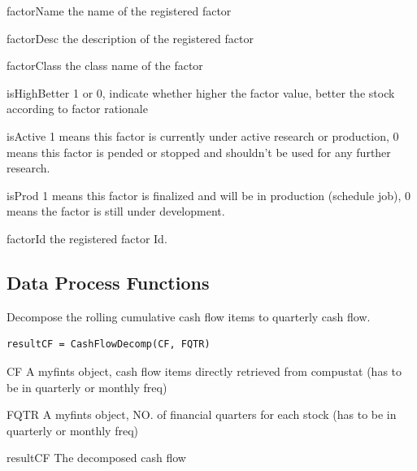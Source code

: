 \inarg
   \begin{argdesc}
   \item[factorName] the name of the registered factor
   \item[factorDesc] the description of the registered factor
   \item[factorClass] the \matlab{} class name of the factor
   \item[isHighBetter] 1 or 0, indicate whether higher the factor value, 
        better the stock according to factor rationale
   \item[isActive] 1 means this factor is currently under active research or production, 
        0 means this factor is pended or stopped and shouldn't be used for any further research. 
   \item[isProd] 1 means this factor is finalized and will be in production (schedule job), 
        0 means the factor is still under development.
   \end{argdesc}

\outarg
   \begin{argdesc}
	  \item[factorId] the registered factor Id. 
   \end{argdesc}


\subsection{Data Process Functions}

Decompose the rolling cumulative cash flow items to quarterly cash flow.

\usage
   \begin{lstlisting}[numbers=none]
   resultCF = CashFlowDecomp(CF, FQTR)
   \end{lstlisting}
   
\inarg
   \begin{argdesc}
	\item[CF] A myfints object, cash flow items directly retrieved from compustat (has to be in quarterly or monthly freq)
	\item[FQTR] A myfints object, NO. of financial quarters for each stock (has to be in quarterly or monthly freq)
   \end{argdesc}
   
\outarg
   \begin{argdesc}
   \item[resultCF] The decomposed cash flow
   \end{argdesc}	

